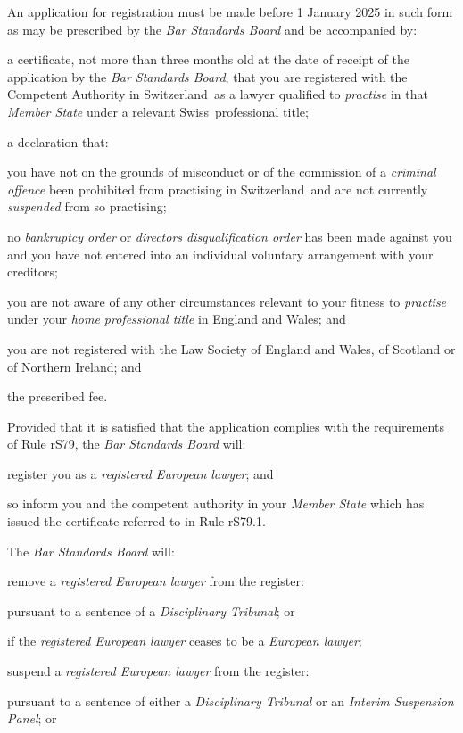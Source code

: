 
An application for registration must be made before 1 January 2025 in
such form as may be prescribed by the \emph{Bar Standards Board} and be
accompanied by:\nl\item a certificate, not more than three months old at the date of receipt
of the application by the \emph{Bar Standards Board}, that you are
registered with the Competent Authority in Switzerland~as a lawyer
qualified to \emph{practise} in that \emph{Member State} under a
relevant Swiss~professional title;
\item a declaration that:

\al\item you have not on the grounds of misconduct or of the commission of a
\emph{criminal offence} been prohibited from practising in
Switzerland~and are not currently \emph{suspended} from so practising;

\item no \emph{bankruptcy order} or \emph{directors disqualification order}
has been made against you and you have not entered into an individual
voluntary arrangement with your creditors;

\item you are not aware of any other circumstances relevant to your fitness
to \emph{practise} under your \emph{home professional title} in England
and Wales; and

\item you are not registered with the Law Society of England and Wales, of
Scotland or of Northern Ireland; and\la
\item the prescribed fee.
\ln
{}

Provided that it is satisfied that the application complies with the
requirements of Rule rS79, the \emph{Bar Standards Board} will:\nl\item register you as a \emph{registered European lawyer}; and
\item so inform you and the competent authority in your \emph{Member State}
which has issued the certificate referred to in Rule rS79.1.
\ln
{}

The \emph{Bar Standards Board} will:\nl\item remove a \emph{registered European lawyer} from the register:
\al
\item pursuant to a sentence of a \emph{Disciplinary Tribunal}; or

\item if the \emph{registered European lawyer} ceases to be a
\emph{European lawyer};\la
\item suspend a \emph{registered European lawyer} from the register:
\al
\item pursuant to a sentence of either a \emph{Disciplinary Tribunal} or an
\emph{Interim Suspension Panel}; or

